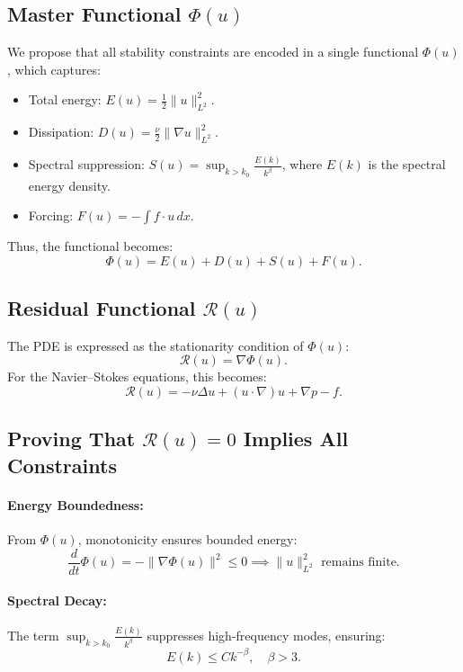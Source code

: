 \documentclass[12pt]{article}
\begin{document}
\subsection{Master Functional \(\Phi(u)\)}
We propose that all stability constraints are encoded in a single functional \(\Phi(u)\), which captures:
\begin{itemize}
    \item Total energy: \(E(u) = \frac{1}{2} \| u \|_{L^2}^2\).
    \item Dissipation: \(D(u) = \frac{\nu}{2} \| \nabla u \|_{L^2}^2\).
    \item Spectral suppression: \(S(u) = \sup_{k > k_0} \frac{E(k)}{k^\beta}\), where \(E(k)\) is the spectral energy density.
    \item Forcing: \(F(u) = -\int f \cdot u \, dx\).
\end{itemize}
Thus, the functional becomes:
\begin{equation}
\Phi(u) = E(u) + D(u) + S(u) + F(u).
\end{equation}

\subsection{Residual Functional \(\mathcal{R}(u)\)}
The PDE is expressed as the stationarity condition of \(\Phi(u)\):
\begin{equation}
\mathcal{R}(u) = \nabla \Phi(u).
\end{equation}
For the Navier--Stokes equations, this becomes:
\begin{equation}
\mathcal{R}(u) = -\nu \Delta u + (u \cdot \nabla) u + \nabla p - f.
\end{equation}

\subsection{Proving That \(\mathcal{R}(u) = 0\) Implies All Constraints}

\paragraph{Energy Boundedness:} From \(\Phi(u)\), monotonicity ensures bounded energy:
\begin{equation}
\frac{d}{dt} \Phi(u) = -\|\nabla \Phi(u)\|^2 \leq 0 \implies \|u\|_{L^2}^2 \text{ remains finite.}
\end{equation}

\paragraph{Spectral Decay:} The term \(\sup_{k > k_0} \frac{E(k)}{k^\beta}\) suppresses high-frequency modes, ensuring:
\begin{equation}
E(k) \leq C k^{-\beta}, \quad \beta > 3.
\end{equation}
\end{document}

